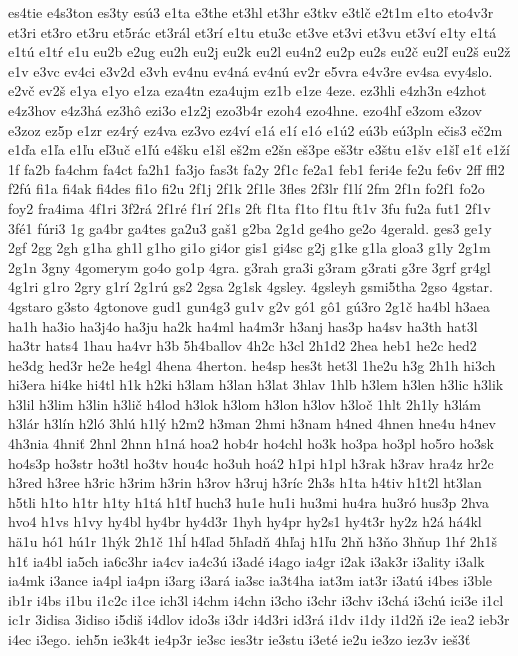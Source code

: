 {es4tie
e4s3ton
es3ty
esú3
e1ta
e3the
et3hl
et3hr
e3tkv
e3tlč
e2t1m
e1to
eto4v3r
et3ri
et3ro
et3ru
et5rác
et3rál
et3rí
e1tu
etu3c
et3ve
et3vi
et3vu
et3ví
e1ty
e1tá
e1tú
e1tŕ
e1u
eu2b
e2ug
eu2h
eu2j
eu2k
eu2l
eu4n2
eu2p
eu2s
eu2č
eu2ľ
eu2š
eu2ž
e1v
e3vc
ev4ci
e3v2d
e3vh
ev4nu
ev4ná
ev4nú
ev2r
e5vra
e4v3re
ev4sa
evy4slo.
e2vč
ev2š
e1ya
e1yo
e1za
eza4tn
eza4ujm
ez1b
e1ze
4eze.
ez3hli
e4zh3n
e4zhot
e4z3hov
e4z3há
ez3hô
ezi3o
e1z2j
ezo3b4r
ezoh4
ezo4hne.
ezo4hľ
e3zom
e3zov
e3zoz
ez5p
e1zr
ez4rý
ez4va
ez3vo
ez4ví
e1á
e1í
e1ó
e1ú2
eú3b
eú3pln
ečis3
eč2m
e1ďa
e1ľa
e1ľu
eľ3uč
e1ľú
e4šku
e1šl
eš2m
e2šn
eš3pe
eš3tr
e3štu
e1šv
e1šľ
e1ť
e1ží
1f
fa2b
fa4chm
fa4ct
fa2h1
fa3jo
fas3t
fa2y
2f1c
fe2a1
feb1
feri4e
fe2u
fe6v
2ff
ffl2
f2fú
fi1a
fi4ak
fi4des
fi1o
fi2u
2f1j
2f1k
2f1le
3fles
2f3lr
f1lí
2fm
2f1n
fo2f1
fo2o
foy2
fra4ima
4f1ri
3f2rá
2f1ré
f1rí
2f1s
2ft
f1ta
f1to
f1tu
ft1v
3fu
fu2a
fut1
2f1v
3fé1
fúri3
1g
ga4br
ga4tes
ga2u3
gaš1
g2ba
2g1d
ge4ho
ge2o
4gerald.
ges3
ge1y
2gf
2gg
2gh
g1ha
gh1l
g1ho
gi1o
gi4or
gis1
gi4sc
g2j
g1ke
g1la
gloa3
g1ly
2g1m
2g1n
3gny
4gomerym
go4o
go1p
4gra.
g3rah
gra3i
g3ram
g3rati
g3re
3grf
gr4gl
4g1ri
g1ro
2gry
g1rí
2g1rú
gs2
2gsa
2g1sk
4gsley.
4gsleyh
gsmi5tha
2gso
4gstar.
4gstaro
g3sto
4gtonove
gud1
gun4g3
gu1v
g2v
gó1
gô1
gú3ro
2g1č
ha4bl
h3aea
ha1h
ha3io
ha3j4o
ha3ju
ha2k
ha4ml
ha4m3r
h3anj
has3p
ha4sv
ha3th
hat3l
ha3tr
hats4
1hau
ha4vr
h3b
5h4ballov
4h2c
h3cl
2h1d2
2hea
heb1
he2c
hed2
he3dg
hed3r
he2e
he4gl
4hena
4herton.
he4sp
hes3t
het3l
1he2u
h3g
2h1h
hi3ch
hi3era
hi4ke
hi4tl
h1k
h2ki
h3lam
h3lan
h3lat
3hlav
1hlb
h3lem
h3len
h3lic
h3lik
h3lil
h3lim
h3lin
h3lič
h4lod
h3lok
h3lom
h3lon
h3lov
h3loč
1hlt
2h1ly
h3lám
h3lár
h3lín
h2ló
3hlú
h1lý
h2m2
h3man
2hmi
h3nam
h4ned
4hnen
hne4u
h4nev
4h3nia
4hniť
2hnl
2hnn
h1ná
hoa2
hob4r
ho4chl
ho3k
ho3pa
ho3pl
ho5ro
ho3sk
ho4s3p
ho3str
ho3tl
ho3tv
hou4c
ho3uh
hoá2
h1pi
h1pl
h3rak
h3rav
hra4z
hr2c
h3red
h3ree
h3ric
h3rim
h3rin
h3rov
h3ruj
h3ríc
2h3s
h1ta
h4tiv
h1t2l
ht3lan
h5tli
h1to
h1tr
h1ty
h1tá
h1tľ
huch3
hu1e
hu1i
hu3mi
hu4ra
hu3ró
hus3p
2hva
hvo4
h1vs
h1vy
hy4bl
hy4br
hy4d3r
1hyh
hy4pr
hy2s1
hy4t3r
hy2z
h2á
há4kl
hä1u
hó1
hú1r
1hýk
2h1č
1hĺ
h4ľad
5hľadň
4hľaj
h1ľu
2hň
h3ňo
3hňup
1hŕ
2h1š
h1ť
ia4bl
ia5ch
ia6c3hr
ia4cv
ia4c3ú
i3adé
i4ago
ia4gr
i2ak
i3ak3r
i3ality
i3alk
ia4mk
i3ance
ia4pl
ia4pn
i3arg
i3ará
ia3sc
ia3t4ha
iat3m
iat3r
i3atú
i4bes
i3ble
ib1r
i4bs
i1bu
i1c2c
i1ce
ich3l
i4chm
i4chn
i3cho
i3chr
i3chv
i3chá
i3chú
ici3e
i1cl
ic1r
3idisa
3idiso
i5diš
i4dlov
ido3s
i3dr
i4d3ri
id3rá
i1dv
i1dy
i1d2ň
i2e
iea2
ieb3r
i4ec
i3ego.
ieh5n
ie3k4t
ie4p3r
ie3sc
ies3tr
ie3stu
i3eté
ie2u
ie3zo
iez3v
ieš3ť
}
